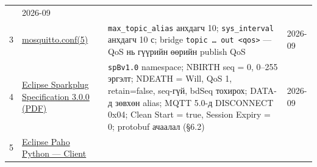 \begin{longtable}[]{@{}llll@{}}
\begin{minipage}[t]{0.22\columnwidth}
\end{minipage} & \begin{minipage}[t]{0.22\columnwidth}\raggedright
2026-09\strut
\end{minipage}\tabularnewline
\begin{minipage}[t]{0.22\columnwidth}\raggedright
3\strut
\end{minipage} & \begin{minipage}[t]{0.22\columnwidth}\raggedright
\href{https://mosquitto.org/man/mosquitto-conf-5.html}{mosquitto.conf(5)}\strut
\end{minipage} & \begin{minipage}[t]{0.22\columnwidth}\raggedright
\texttt{max\_\allowbreak{}topic\_\allowbreak{}alias} анхдагч 10; \texttt{sys\_interval} анхдагч 10 с; bridge \texttt{topic\ \ldots{}\ out\ \textless{}qos\textgreater{}} --- QoS нь гүүрийн өөрийн publish QoS\strut
\end{minipage} & \begin{minipage}[t]{0.22\columnwidth}\raggedright
2026-09\strut
\end{minipage}\tabularnewline
\begin{minipage}[t]{0.22\columnwidth}\raggedright
4\strut
\end{minipage} & \begin{minipage}[t]{0.22\columnwidth}\raggedright
\href{https://sparkplug.eclipse.org/specification/version/3.0/documents/sparkplug-specification-3.0.0.pdf}{Eclipse Sparkplug Specification 3.\allowbreak{}0.\allowbreak{}0 (PDF)}\strut
\end{minipage} & \begin{minipage}[t]{0.22\columnwidth}\raggedright
\texttt{spBv1.0} namespace; NBIRTH seq = 0, 0--255 эргэлт; NDEATH = Will, QoS 1, retain=false, seq-гүй, bdSeq тохирох; DATA-д зөвхөн alias; MQTT 5.0-д DISCONNECT 0x04; Clean Start = true, Session Expiry = 0; protobuf ачаалал (§6.2)\strut
\end{minipage} & \begin{minipage}[t]{0.22\columnwidth}\raggedright
2026-09\strut
\end{minipage}\tabularnewline
\begin{minipage}[t]{0.22\columnwidth}\raggedright
5\strut
\end{minipage} & \begin{minipage}[t]{0.22\columnwidth}\raggedright
\href{https://eclipse.dev/paho/files/paho.mqtt.python/html/client.html}{Eclipse Paho Python --- Client}\strut
\end{minipage} & \begin{minipage}[t]{0.22\columnwidth}\raggedright

\end{minipage}
\end{longtable}

